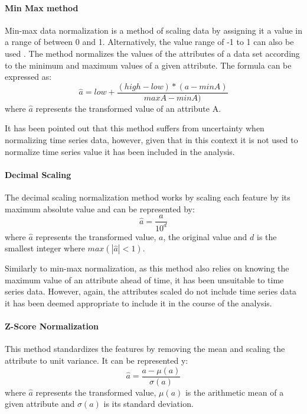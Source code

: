 \paragraph{Min Max method}\label{sec:data-modelling:scalers:min-max}
Min-max data normalization is a method of scaling data by assigning it a value in a range of between 0 and 1. Alternatively, the value range of -1 to 1 can also be used \cite{dataNormalization2014}. The method normalizes the values of the attributes of a data set according to the minimum and maximum values of a given attribute. The formula can be expressed as:
\begin{equation}\label{eq:min-max}
    \hat{a} = low+ \frac{(high - low)*(a - minA)}{maxA - minA)} 
\end{equation}
where $\hat{a}$ represents the transformed value of an attribute A.

It has been pointed out that this method suffers from uncertainty when normalizing time series data\cite{dataNormalization2014}, however, given that in this context it is not used to normalize time series value it has been included in the analysis.
\paragraph{Decimal Scaling}\label{sec:data-modelling:scalers:max-abs}
The decimal scaling normalization method works by scaling each feature by its maximum absolute value and can be represented by:
\begin{equation}
    \hat{a} = \frac{a}{10^d}
\end{equation}
where $\hat{a}$ represents the transformed value, $a$, the original value and $d$ is the smallest integer where $max(|\hat{a}|<1)$.

Similarly to min-max normalization, as this method also relies on knowing the maximum value of an attribute ahead of time, it has been unsuitable to time series data\cite{dataNormalization2014}. However, again, the attributes scaled do not include time series data it has been deemed appropriate to include it in the course of the analysis.

\paragraph{Z-Score Normalization}\label{sec:data-modelling:scalers:standard}
This method standardizes the features by removing the mean and scaling the attribute to unit variance. It can be represented y:
\begin{equation}
    \hat{a} = \frac{a - \mu(a)}{\sigma(a)}
\end{equation}
where $\hat{a}$ represents the transformed value, $\mu(a)$ is the arithmetic mean of a given attribute and $\sigma(a)$ is its standard deviation.

